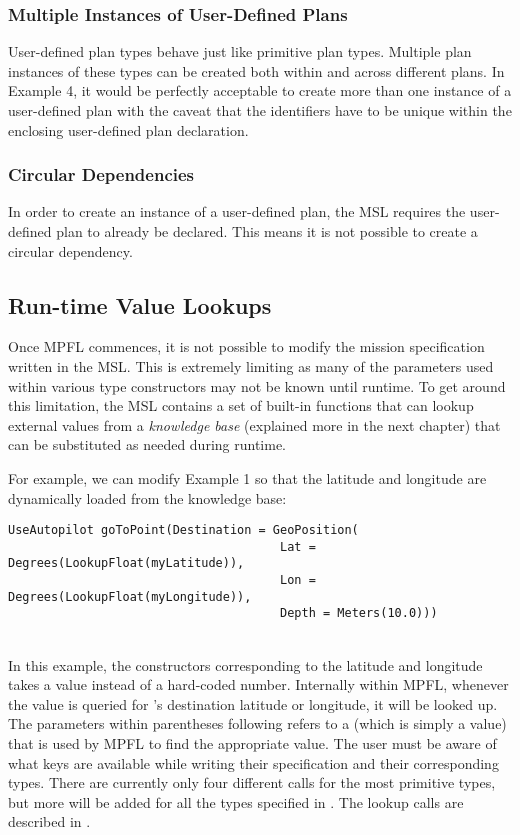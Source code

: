 \subsubsection{Multiple Instances of User-Defined Plans}
User-defined plan types behave just like primitive plan types. Multiple plan instances of these types can be created both within and across different plans. In Example 4, it would be perfectly acceptable to create more than one instance of a  user-defined plan with the caveat that the identifiers have to be unique within the enclosing user-defined plan declaration.

\subsubsection{Circular Dependencies}
In order to create an instance of a user-defined plan, the MSL requires the user-defined plan to already be declared. This means it is not possible to create a circular dependency.

\subsection{Run-time Value Lookups}
Once MPFL commences, it is not possible to modify the mission specification written in the MSL. This is extremely limiting as many of the parameters used within various type constructors may not be known until runtime. To get around this limitation, the MSL contains a set of built-in functions that can lookup external values from a \textit{knowledge base} (explained more in the next chapter) that can be substituted as needed during runtime.

For example, we can modify Example 1 so that the latitude and longitude are dynamically loaded from the knowledge base:

\begin{verbatim}
UseAutopilot goToPoint(Destination = GeoPosition(
                                      Lat = Degrees(LookupFloat(myLatitude)),
                                      Lon = Degrees(LookupFloat(myLongitude)),
                                      Depth = Meters(10.0)))
\end{verbatim}
\\

In this example, the  constructors corresponding to the latitude and longitude takes a  value instead of a hard-coded number. Internally within MPFL, whenever the value is queried for 's destination latitude or longitude, it will be looked up. The parameters within parentheses following  refers to a  (which is simply a  value) that is used by MPFL to find the appropriate value. The user must be aware of what keys are available while writing their specification and their corresponding types. There are currently only four different  calls for the most primitive types, but more will be added for all the types specified in . The lookup calls are described in .

